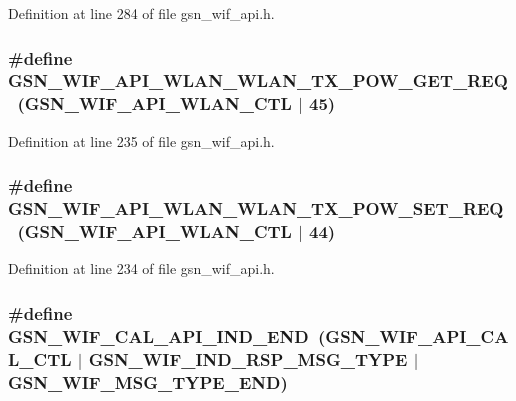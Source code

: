 Definition at line 284 of file gsn\_\-wif\_\-api.h.

\hypertarget{a00606_a0f5d7572b7b55ea1ef95405de1a96c6f}{
\subsubsection[{GSN\_\-WIF\_\-API\_\-WLAN\_\-WLAN\_\-TX\_\-POW\_\-GET\_\-REQ}]{\setlength{\rightskip}{0pt plus 5cm}\#define GSN\_\-WIF\_\-API\_\-WLAN\_\-WLAN\_\-TX\_\-POW\_\-GET\_\-REQ~(GSN\_\-WIF\_\-API\_\-WLAN\_\-CTL $|$ 45)}}
\label{a00606_a0f5d7572b7b55ea1ef95405de1a96c6f}


Definition at line 235 of file gsn\_\-wif\_\-api.h.

\hypertarget{a00606_a966d1c5a360a22f0bc4666e1999f1627}{
\subsubsection[{GSN\_\-WIF\_\-API\_\-WLAN\_\-WLAN\_\-TX\_\-POW\_\-SET\_\-REQ}]{\setlength{\rightskip}{0pt plus 5cm}\#define GSN\_\-WIF\_\-API\_\-WLAN\_\-WLAN\_\-TX\_\-POW\_\-SET\_\-REQ~(GSN\_\-WIF\_\-API\_\-WLAN\_\-CTL $|$ 44)}}
\label{a00606_a966d1c5a360a22f0bc4666e1999f1627}


Definition at line 234 of file gsn\_\-wif\_\-api.h.

\hypertarget{a00606_a197b7d6afa8a6ab40f07ac83b9368bda}{
\subsubsection[{GSN\_\-WIF\_\-CAL\_\-API\_\-IND\_\-END}]{\setlength{\rightskip}{0pt plus 5cm}\#define GSN\_\-WIF\_\-CAL\_\-API\_\-IND\_\-END~(GSN\_\-WIF\_\-API\_\-CAL\_\-CTL $|$ GSN\_\-WIF\_\-IND\_\-RSP\_\-MSG\_\-TYPE $|$ GSN\_\-WIF\_\-MSG\_\-TYPE\_\-END)}}
\label{a00606_a197b7d6afa8a6ab40f07ac83b9368bda}


